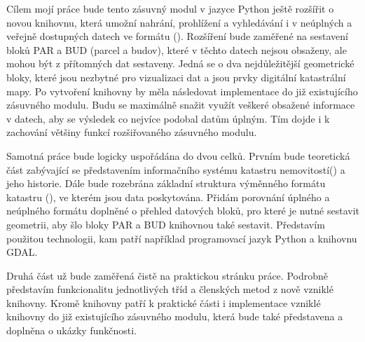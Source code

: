 Cílem mojí práce bude tento zásuvný modul v jazyce Python ještě rozšířit o novou knihovnu, která umožní nahrání, prohlížení a vyhledávání i v neúplných a veřejně dostupných datech ve formátu (). Rozšíření bude zaměřené na sestavení bloků PAR a BUD (parcel a budov), které v těchto datech nejsou obsaženy, ale mohou být z přítomných dat sestaveny. Jedná se o dva nejdůležitější geometrické bloky, které jsou nezbytné pro vizualizaci dat a jsou prvky digitální katastrální mapy. Po vytvoření knihovny by měla následovat implementace do již existujícího zásuvného modulu. Budu se maximálně snažit využít veškeré obsažené informace v datech, aby se výsledek co nejvíce podobal datům úplným. Tím dojde i k zachování většiny funkcí rozšiřovaného zásuvného modulu.

Samotná práce bude logicky uspořádána do dvou celků. Prvním bude teoretická část zabývající se představením informačního systému katastru nemovitostí() a jeho historie. Dále bude rozebrána základní struktura výměnného formátu katastru (), ve kterém jsou data poskytována. Přidám porovnání úplného a neúplného formátu doplněné o přehled datových bloků, pro které je nutné sestavit geometrii, aby šlo bloky PAR a BUD knihovnou také sestavit. Představím použitou technologii, kam patří například programovací jazyk Python a knihovnu GDAL.

Druhá část už bude zaměřená čistě na praktickou stránku práce. Podrobně představím funkcionalitu jednotlivých tříd a členských metod z nově vzniklé knihovny. Kromě knihovny patří k praktické části i implementace vzniklé knihovny do již existujícího zásuvného modulu, která bude také představena a doplněna o ukázky funkčnosti.


